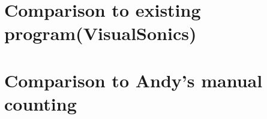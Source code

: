 \section{Comparison to existing program(VisualSonics)}
\section{Comparison to Andy's manual counting}
